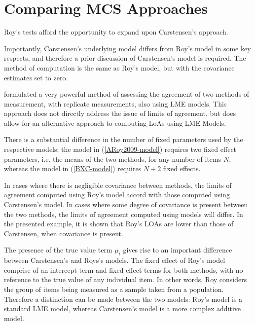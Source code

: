 \documentclass[12pt, a4paper]{report}
\theoremstyle{plain}
\theoremstyle{definition}
\theoremstyle{remark}
\begin{document}
\section{Comparing MCS Approaches }	
Roy's tests afford the opportunity to expand upon Carstensen's approach. 

 Importantly, Carstensen's underlying model differs from Roy's model in some key respects, and therefore a prior discussion of Carstensen's model is required. The method of computation is the
 same as Roy's model, but with the covariance estimates set to zero.
 

\citet{ARoy2009} formulated a very powerful method of assessing the agreement of two methods of measurement, with replicate measurements, also using LME models. This approach does not directly address the issue of limits of agreement, but does allow for an alternative approach to computing LoAs using LME Models. 
 
There is a substantial difference in the number of fixed parameters used by the respective models; the model in (\ref{ARoy2009-model}) requires two fixed effect parameters, i.e. the means of the two methods, for any number of items $N$, whereas the model in (\ref{BXC-model}) requires $N+2$ fixed effects.

	
 In cases where there is negligible covariance between methods, the limits of agreement computed using Roy's model accord with those computed using Carstensen's model. In cases where some degree of
 covariance is present between the two methods, the limits of agreement computed using models will differ. In the presented
 example, it is shown that Roy's LOAs are lower than those of Carstensen, when covariance is present.
	
The presence of the true value term $\mu_i$ gives rise to an important difference between Carstensen's and Roys's models. The fixed effect of Roy's model comprise of an intercept term and fixed effect terms for both methods, with no reference to the true value of any individual item. In other words, Roy considers the group of items being measured as a sample taken from a population. Therefore a distinction can be made between the two models: Roy's model is a standard LME model, whereas Carstensen's model is a more complex additive model.

		
\end{document}
